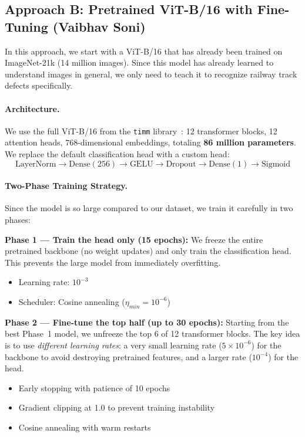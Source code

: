 \documentclass[10pt,twocolumn,letterpaper]{article}
\begin{document}
\subsection{Approach B: Pretrained ViT-B/16 with Fine-Tuning (Vaibhav Soni)}

In this approach, we start with a ViT-B/16 that has already been trained on ImageNet-21k (14 million images). Since this model has already learned to understand images in general, we only need to teach it to recognize railway track defects specifically.

\paragraph{Architecture.}
We use the full ViT-B/16 from the \texttt{timm} library~\cite{Wightman2021}: 12 transformer blocks, 12 attention heads, 768-dimensional embeddings, totaling \textbf{86 million parameters}. We replace the default classification head with a custom head:
$$\text{LayerNorm} \to \text{Dense}(256) \to \text{GELU} \to \text{Dropout} \to \text{Dense}(1) \to \text{Sigmoid}$$

\paragraph{Two-Phase Training Strategy.}
Since the model is so large compared to our dataset, we train it carefully in two phases:

\textbf{Phase 1 --- Train the head only (15 epochs):}
We freeze the entire pretrained backbone (no weight updates) and only train the classification head. This prevents the large model from immediately overfitting.
\begin{itemize}[leftmargin=*, itemsep=1pt]
    \item Learning rate: $10^{-3}$
    \item Scheduler: Cosine annealing ($\eta_{min} = 10^{-6}$)
\end{itemize}

\textbf{Phase 2 --- Fine-tune the top half (up to 30 epochs):}
Starting from the best Phase~1 model, we unfreeze the top 6 of 12 transformer blocks. The key idea is to use \textit{different learning rates}: a very small learning rate ($5 \times 10^{-6}$) for the backbone to avoid destroying pretrained features, and a larger rate ($10^{-4}$) for the head.
\begin{itemize}[leftmargin=*, itemsep=1pt]
    \item Early stopping with patience of 10 epochs
    \item Gradient clipping at 1.0 to prevent training instability
    \item Cosine annealing with warm restarts
\end{itemize}
\end{document}

